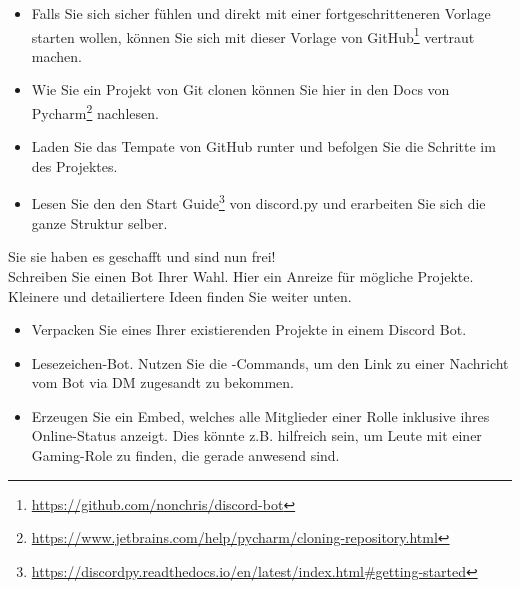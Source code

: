 \documentclass{ubo_tex_uebungszettel/uebungszettel}
\theoremstyle{definition}
\newcommand{\pp}[1]{\lpl{#1}}
\newcommand{\furl}[1]{\footnote{\url{#1}}}
\begin{document}
\begin{aufg}
		\begin{itemize}
			\item Falls Sie sich sicher fühlen und direkt mit einer fortgeschritteneren Vorlage starten wollen, können Sie sich mit dieser Vorlage von GitHub\furl{https://github.com/nonchris/discord-bot} vertraut machen.
			\item Wie Sie ein Projekt von Git clonen können Sie hier in den Docs von Pycharm\furl{https://www.jetbrains.com/help/pycharm/cloning-repository.html} nachlesen.\\
			\item Laden Sie das Tempate von GitHub runter und befolgen Sie die Schritte im \pp{README} des Projektes.
		\end{itemize}

        \noindent{} \quad
		
		\begin{itemize}
			\item Lesen Sie den den Start Guide\furl{https://discordpy.readthedocs.io/en/latest/index.html\#getting-started} von discord.py und erarbeiten Sie sich die ganze Struktur selber.
		\end{itemize}
	\end{aufg}
	
	\pagebreak
	
	\noindent {} \quad
	
	\noindent Sie sie haben es geschafft und sind nun frei!\\
	Schreiben Sie einen Bot Ihrer Wahl. Hier ein Anreize für mögliche Projekte. Kleinere und detailiertere Ideen finden Sie weiter unten.
	
	\begin{itemize}
		
		\item Verpacken Sie eines Ihrer existierenden Projekte in einem Discord Bot.
		
		\item Lesezeichen-Bot. Nutzen Sie die \pp{Context}-Commands, um den Link zu einer Nachricht vom Bot via DM zugesandt zu bekommen.
		
		\item Erzeugen Sie ein Embed, welches alle Mitglieder einer Rolle inklusive ihres Online-Status anzeigt. Dies könnte z.B. hilfreich sein, um Leute mit einer Gaming-Role zu finden, die gerade anwesend sind.

	\end{itemize}
	
	\noindent {} \quad
		
\end{document}
